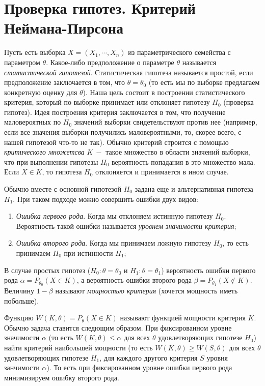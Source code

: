\section{Проверка гипотез. Критерий Неймана-Пирсона}

Пусть есть выборка $X = \left(X_1, \cdots, X_n\right)$ из параметрического семейства с параметром $\theta$. Какое-либо предположение о параметре $\theta$ называется \textit{статистической гипотезой}. Статистическая гипотеза называется простой, если предположение заключается в том, что $\theta = \theta_0$ (то есть мы по выборке предлагаем конкретную оценку для $\theta$). Наша цель состоит в построении статистического критерия, который по выборке принимает или отклоняет гипотезу $H_0$ (проверка гипотез). Идея построения критерия заключается в том, что получение маловероятных по $H_0$ значений выборки свидетельствуют против нее (например, если все значения выборки получились маловероятными, то, скорее всего, с нашей гипотезой что-то не так). Обычно критерий строится с помощью \textit{критического множетсва} $K \ - $ такое множество в области значений выборки, что при выполнении гипотезы $H_0$ вероятность попадания в это множество мала. Если $X \in K$, то гипотеза $H_0$ отклоняется и принимается в ином случае.
\par
Обычно вместе с основной гипотезой $H_0$ задана еще и альтернативная гипотеза $H_1$. При таком подходе можно совершить ошибки двух видов:
\begin{enumerate}
    \item \textit{Ошибка первого рода}. Когда мы отклоняем истинную гипотезу $H_0$. Вероятность такой ошибки называется \textit{уровнем значимости критерия};
    \item \textit{Ошибка второго рода}. Когда мы принимаем ложную гипотезу $H_0$, то есть принимаем $H_0$ при истинности $H_1$;
\end{enumerate}
\par
В случае простых гипотез ($H_0: \theta = \theta_0$ и $H_1: \theta = \theta_1$) вероятность ошибки первого рода $\alpha = P_{\theta_0}\left(X \in K\right)$, а вероятность ошибки второго рода $\beta = P_{\theta_1}\left(X \not\in K\right)$. Величину $1 - \beta$ называют \textit{мощностью критерия} (хочется мощность иметь побольше).
\par 
Функцию $W\left(K, \theta\right) = P_\theta\left(X \in K\right)$ называют функцией мощности критерия $K$. Обычно задача ставится следющим образом. При фиксированном уровне значимости $\alpha$ (то есть $W\left(K, \theta\right) \leq \alpha$ для всех $\theta$ удовлетворяющих гипотезе $H_0$) найти критерий наибольшей мощности (то есть $W\left(K, \theta\right) \geq W\left(S, \theta\right)$ для всех $\theta$ удовлетворяющих гипотезе $H_1$, для каждого другого критерия $S$ уровня занчимости $\alpha$). То есть при фиксированном уровне ошибки первого рода минимизируем ошибку второго рода.

